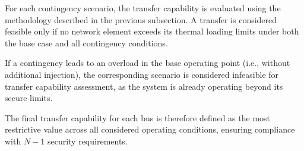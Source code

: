 For each contingency scenario, the transfer capability is evaluated using the methodology described in the previous subsection. A transfer is considered feasible only if no network element exceeds its thermal loading limits under both the base case and all contingency conditions.

If a contingency leads to an overload in the base operating point (i.e., without additional injection), the corresponding scenario is considered infeasible for transfer capability assessment, as the system is already operating beyond its secure limits.

The final transfer capability for each bus is therefore defined as the most restrictive value across all considered operating conditions, ensuring compliance with $N-1$ security requirements.